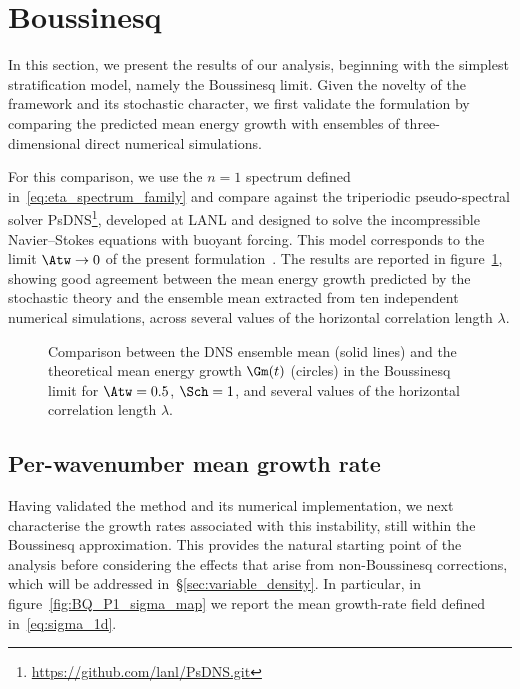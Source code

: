 \section{Boussinesq}
\label{sec:boussinesq}

In this section, we present the results of our analysis, beginning with the simplest
stratification model, namely the Boussinesq limit. Given the novelty of the framework and its
stochastic character, we first validate the formulation by comparing the predicted mean energy
growth with ensembles of three-dimensional direct numerical simulations.

For this comparison, we use the \(n=1\) spectrum defined in~\eqref{eq:eta_spectrum_family} and
compare against the triperiodic pseudo-spectral solver
PsDNS\footnote{\url{https://github.com/lanl/PsDNS.git}}, developed at LANL and designed to solve
the incompressible Navier--Stokes equations with buoyant forcing. This model corresponds to the
limit \(\Atw \to 0\) of the present formulation~\citep{livescu-ristorcelli-2007}. The results are
reported in figure~\ref{fig:compare_dns}, showing good agreement between the mean energy growth
predicted by the stochastic theory and the ensemble mean extracted from ten independent numerical
simulations, across several values of the horizontal correlation length \(\lambda\).

\begin{figure}
    \centering
    
    \caption{Comparison between the DNS ensemble mean (solid lines) and the theoretical mean
    energy growth \(\Gm(t)\) (circles) in the Boussinesq limit for \(\Atw=0.5\), \(\Sch=1\), and
    several values of the horizontal correlation length \(\lambda\).}
    \label{fig:compare_dns}
\end{figure}

\subsection{Per-wavenumber mean growth rate}
Having validated the method and its numerical implementation, we next characterise the growth
rates associated with this instability, still within the Boussinesq approximation. This provides
the natural starting point of the analysis before considering the effects that arise from
non-Boussinesq corrections, which will be addressed in~\S\ref{sec:variable_density}. In
particular, in figure~\ref{fig:BQ_P1_sigma_map} we report the mean growth-rate field defined
in~\eqref{eq:sigma_1d}.

